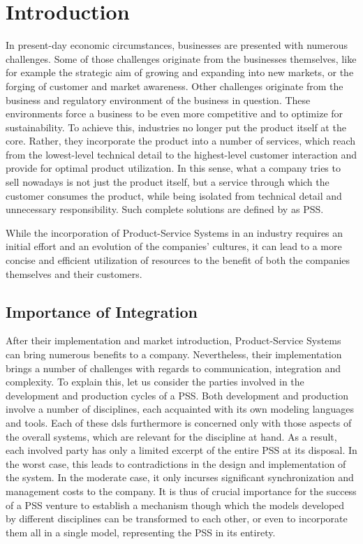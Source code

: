 \chapter{Introduction}
\label{chap:intro}

In present-day economic circumstances, businesses are presented with numerous challenges. Some of those challenges originate from the businesses themselves, like for example the strategic aim of growing and expanding into new markets, or the forging of customer and market awareness. Other challenges originate from the business and regulatory environment of the business in question. These environments force a business to be even more competitive and to optimize for sustainability. To achieve this, industries no longer put the product itself at the core. Rather, they incorporate the product into a number of services, which reach from the lowest-level technical detail to the highest-level customer interaction and provide for optimal product utilization. In this sense, what a company tries to sell nowadays is not just the product itself, but a service through which the customer consumes the product, while being isolated from technical detail and unnecessary responsibility. Such complete solutions are defined by \cite{ref:schenkl} as \gls{PSS}.

While the incorporation of Product-Service Systems in an industry requires an initial effort and an evolution of the companies' cultures, it can lead to a more concise and efficient utilization of resources to the benefit of both the companies themselves and their customers. 

\section*{Importance of Integration}

After their implementation and market introduction, Product-Service Systems can bring numerous benefits to a company. Nevertheless, their implementation brings a number of challenges with regards to communication, integration and complexity. To explain this, let us consider the parties involved in the development and production cycles of a \gls{PSS}. Both development and production involve a number of disciplines, each acquainted with its own modeling languages and tools. Each of these \glspl{dsl} furthermore is concerned only with those aspects of the overall systems, which are relevant for the discipline at hand. As a result, each involved party has only a limited excerpt of the entire \gls{PSS} at its disposal. In the worst case, this leads to contradictions in the design and implementation of the system. In the moderate case, it only incurses significant synchronization and management costs to the company. It is thus of crucial importance for the success of a PSS venture to establish a mechanism though which the models developed by different disciplines can be transformed to each other, or even to incorporate them all in a single model, representing the \gls{PSS} in its entirety.

